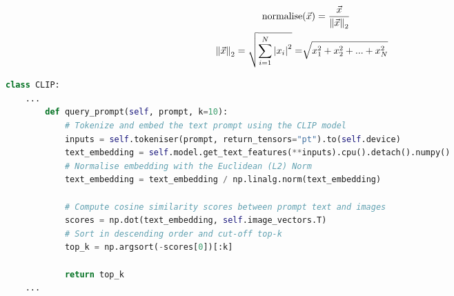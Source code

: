 \documentclass{l4proj}
\begin{document}
\begin{equation}
\begin{split}
    \text{normalise}&(\vec{x}) = \frac{\vec{x}}{\norm{\vec{x}}_2} \\
    \norm{\vec{x}}_2 = \sqrt{\sum_{i=1}^N \abs{x_i}^2} =& \sqrt{x_1^2 + x_2^2 + ... + x_N^2}
    \label{eq:euclidean_normalisation}
\end{split}
\end{equation}

\begin{lstlisting}[language=python, float, caption={An algorithm implementing the \textbf{\lstinline|query_prompt|} function that performs an exhaustive inner product search and retrieval of the top-$k$ images for the passed in text prompt. Defined as an internal function within the custom \textbf{\lstinline|CLIP|} class.}, label=lst:query_prompt]
    class CLIP:
    ...
        def query_prompt(self, prompt, k=10):
            # Tokenize and embed the text prompt using the CLIP model
            inputs = self.tokeniser(prompt, return_tensors="pt").to(self.device)
            text_embedding = self.model.get_text_features(**inputs).cpu().detach().numpy()
            # Normalise embedding with the Euclidean (L2) Norm
            text_embedding = text_embedding / np.linalg.norm(text_embedding)

            # Compute cosine similarity scores between prompt text and images
            scores = np.dot(text_embedding, self.image_vectors.T)
            # Sort in descending order and cut-off top-k
            top_k = np.argsort(-scores[0])[:k]

            return top_k
    ...
\end{lstlisting}

\end{document}
